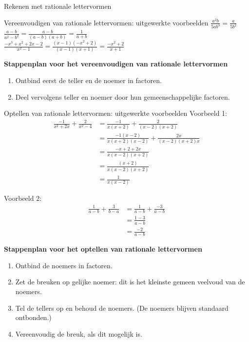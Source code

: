  \vspace{0.5cm}
\begin{lesactiviteit}{Rekenen met rationale lettervormen}
	\begin{kader}{}{Vereenvoudigen van rationale lettervormen: uitgewerkte voorbeelden}
		$\displaystyle \frac{a^2 b}{5ab^3}=\frac{a}{5b^2}$\\
		
		$\displaystyle \frac{a-b}{a^2-b^2}=\frac{a-b}{(a-b)(a+b)}=\frac{1}{a+b}$\\
		
		$\displaystyle \frac{-x^3+x^2+2x-2}{x^2-1}=\frac{(x-1)(-x^2+2)}{(x-1)(x+1)}=\frac{-x^2+2}{x+1}$\\
\end{kader}

\textbf{Stappenplan voor het vereenvoudigen van rationale lettervormen}
\begin{enumerate}
	\item Ontbind eerst de teller en de noemer in factoren.
	\item Deel vervolgens teller en noemer door hun gemeenschappelijke factoren.
\end{enumerate}
\vspace{1cm}

\begin{kader}{}{Optellen van rationale lettervormen: uitgewerkte voorbeelden}
Voorbeeld 1:
\begin{align*}
\frac{-1}{x^2+2x}+\frac{2}{x^2-4}&=\frac{-1}{x(x+2)}+\frac{2}{(x-2)(x+2)} \\
&=\frac{-1 (x-2)}{x(x+2)(x-2)}+\frac{2x}{(x-2)(x+2)x}\\
&=\frac{-x+2+2x}{x(x-2)(x+2)} \\
&=\frac{(x+2)}{x(x-2)(x+2)} \\
&=\frac{1}{x(x-2)}
\end{align*}

Voorbeeld 2:
\begin{align*}
	\frac{1}{a-b}+\frac{3}{b-a} & = \frac{1}{a-b}+\frac{-3}{a-b}\\
								& = \frac{1-3}{a-b}\\
								& = \frac{-2}{a-b}
\end{align*}
\end{kader}	
\textbf{Stappenplan voor het optellen van rationale lettervormen}
\begin{enumerate}
	\item Ontbind de noemers in factoren.
	\item Zet de breuken op gelijke noemer: dit is het kleinste gemeen veelvoud van de noemers.
	\item Tel de tellers op en behoud de noemers. (De noemers blijven standaard ontbonden.)
	\item Vereenvoudig de breuk, als dit mogelijk is.
\end{enumerate}
\vspace{1cm}



\end{lesactiviteit}
